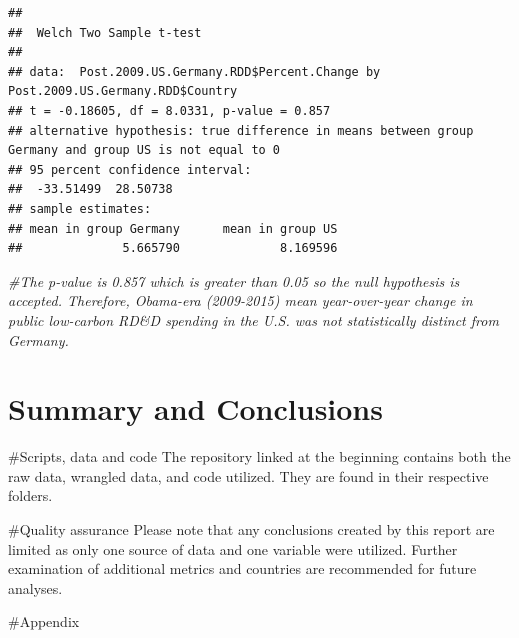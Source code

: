 \documentclass[
  12pt,
]{article}
\newenvironment{Shaded}{\begin{snugshade}}{\end{snugshade}}
\newcommand{\CommentTok}[1]{\textcolor[rgb]{0.56,0.35,0.01}{\textit{#1}}}
\begin{document}
\begin{verbatim}
## 
##  Welch Two Sample t-test
## 
## data:  Post.2009.US.Germany.RDD$Percent.Change by Post.2009.US.Germany.RDD$Country
## t = -0.18605, df = 8.0331, p-value = 0.857
## alternative hypothesis: true difference in means between group Germany and group US is not equal to 0
## 95 percent confidence interval:
##  -33.51499  28.50738
## sample estimates:
## mean in group Germany      mean in group US 
##              5.665790              8.169596
\end{verbatim}

\begin{Shaded}
\begin{Highlighting}[]
          \CommentTok{\#The p{-}value is 0.857 which is greater than 0.05 so the null hypothesis is accepted. Therefore, Obama{-}era (2009{-}2015) mean year{-}over{-}year change in public low{-}carbon RD\&D spending in the U.S. was not statistically distinct from Germany.}
\end{Highlighting}
\end{Shaded}

\newpage

\hypertarget{summary-and-conclusions}{%
\section{Summary and Conclusions}\label{summary-and-conclusions}}

\newpage

\#Scripts, data and code The repository linked at the beginning contains
both the raw data, wrangled data, and code utilized. They are found in
their respective folders.

\#Quality assurance Please note that any conclusions created by this
report are limited as only one source of data and one variable were
utilized. Further examination of additional metrics and countries are
recommended for future analyses.

\newpage

\#Appendix
\end{document}
